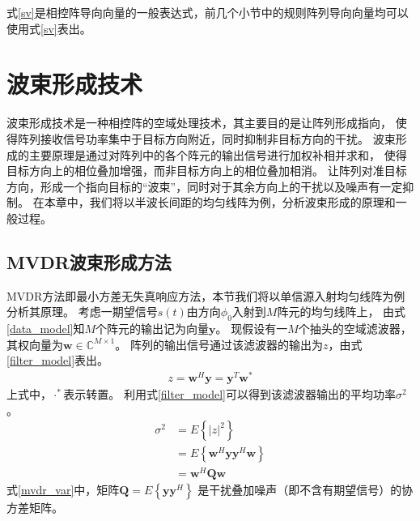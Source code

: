 \documentclass[master]{thesis-uestc}
\begin{document}
式\eqref{sv}是相控阵导向向量的一般表达式，前几个小节中的规则阵列导向向量均可以使用式\eqref{sv}表出。

\section{波束形成技术}
波束形成技术是一种相控阵的空域处理技术，其主要目的是让阵列形成指向，
使得阵列接收信号功率集中于目标方向附近，同时抑制非目标方向的干扰。
波束形成的主要原理是通过对阵列中的各个阵元的输出信号进行加权补相并求和，
使得目标方向上的相位叠加增强，而非目标方向上的相位叠加相消。
让阵列对准目标方向，形成一个指向目标的“波束”，同时对于其余方向上的干扰以及噪声有一定抑制。
在本章中，我们将以半波长间距的均匀线阵为例，分析波束形成的原理和一般过程。

\subsection{MVDR波束形成方法}
MVDR方法即最小方差无失真响应方法，本节我们将以单信源入射均匀线阵为例分析其原理。
考虑一期望信号$s(t)$由方向$\phi_0$入射到$M$阵元的均匀线阵上，
由式\eqref{data_model}知$M$个阵元的输出记为向量$\bm{y}$。
现假设有一$M$个抽头的空域滤波器，其权向量为$\bm{w}\in\mathbb{C}^{M\times1}$。
阵列的输出信号通过该滤波器的输出为$z$，由式\eqref{filter_model}表出。
\begin{equation}\label{filter_model}
    \begin{aligned}
    z = \bm{w}^H\bm{y} = \bm{y}^T\bm{w}^*
    \end{aligned}
\end{equation}
上式中，$\cdot^*$表示转置。
利用式\eqref{filter_model}可以得到该滤波器输出的平均功率$\sigma^2$。
\begin{equation}\label{mvdr_var}
    \begin{aligned}
    \sigma^2 &= E\left\{|z|^2\right\} \\
             &= E\left\{\bm{w}^H\bm{y}\bm{y}^H\bm{w}\right\} \\
             &= \bm{w}^H\bm{Q}\bm{w}
    \end{aligned}
\end{equation}
式\eqref{mvdr_var}中，矩阵$\bm{Q}=E\left\{\bm{y}\bm{y}^H\right\}$
是干扰叠加噪声（即不含有期望信号）的协方差矩阵。
\end{document}
